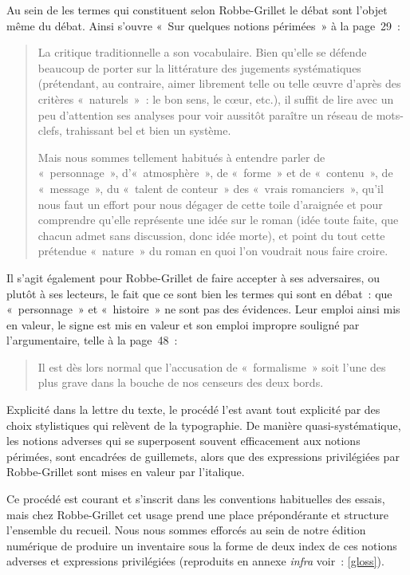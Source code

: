 \documentclass[12pt, a4paper]{article}
\begin{document}
Au sein de \punr les termes qui constituent selon Robbe-Grillet le débat sont l'objet même du débat. Ainsi s'ouvre «~Sur quelques notions périmées~» à la page~29~:
\begin{quote}
    La critique traditionnelle a son vocabulaire. Bien qu’elle se défende beaucoup de porter sur la littérature des jugements systématiques (prétendant, au contraire, aimer librement telle ou telle œuvre d’après des critères «~naturels~»~: le bon sens, le cœur, etc.), il suffit de lire avec un peu d’attention ses analyses pour voir aussitôt paraître un réseau de mots-clefs, trahissant bel et bien un système.

    Mais nous sommes tellement habitués à entendre parler de «~personnage~», d’«~atmosphère~», de «~forme~» et de «~contenu~», de «~message~», du «~talent de conteur~» des «~vrais romanciers~», qu’il nous faut un effort pour nous dégager de cette toile d’araignée et pour comprendre qu’elle représente une idée sur le roman (idée toute faite, que chacun admet sans discussion, donc idée morte), et point du tout cette prétendue «~nature~» du roman en quoi l’on voudrait nous faire croire.
\end{quote}
Il s'agit également pour Robbe-Grillet de faire accepter à ses adversaires, ou plutôt à ses lecteurs, le fait que ce sont bien les termes qui sont en débat~: que «~personnage~» et «~histoire~» ne sont pas des évidences. Leur emploi ainsi mis en valeur, le signe est mis en valeur et son emploi impropre souligné par l'argumentaire, telle à la page~48~:
\begin{quote}
    Il est dès lors normal que l'accusation de «~formalisme~» soit l'une des plus grave dans la bouche de nos censeurs des deux bords.
\end{quote}

Explicité dans la lettre du texte, le procédé l'est avant tout explicité par des choix stylistiques qui relèvent de la typographie. De manière quasi-systématique, les notions adverses qui se superposent souvent efficacement aux notions périmées, sont encadrées de guillemets, alors que des expressions privilégiées par Robbe-Grillet sont mises en valeur par l'italique.

Ce procédé est courant et s'inscrit dans les conventions habituelles des essais, mais chez Robbe-Grillet cet usage prend une place prépondérante et structure l'ensemble du recueil. Nous nous sommes efforcés au sein de notre édition numérique de produire un inventaire sous la forme de deux index de ces notions adverses et expressions privilégiées (reproduits en annexe \textit{infra} voir~: \ref{gloss}).
\end{document}
